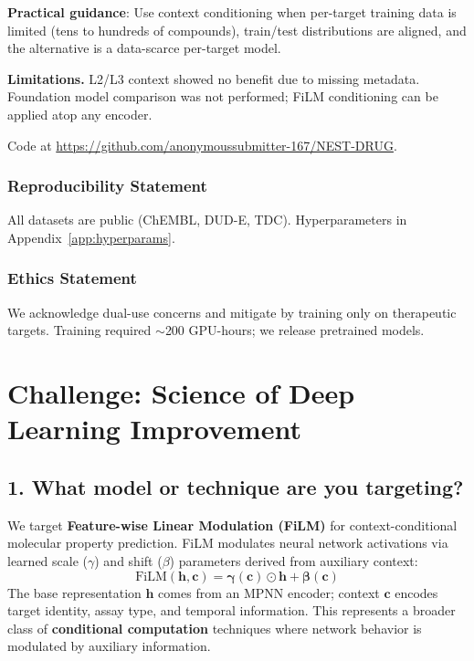 \documentclass{article}
\begin{document}
\textbf{Practical guidance}: Use context conditioning when per-target training data is limited (tens to hundreds of compounds), train/test distributions are aligned, and the alternative is a data-scarce per-target model.

\textbf{Limitations.} L2/L3 context showed no benefit due to missing metadata. Foundation model comparison was not performed; FiLM conditioning can be applied atop any encoder.

Code at \url{https://github.com/anonymoussubmitter-167/NEST-DRUG}.

\subsubsection*{Reproducibility Statement}
All datasets are public (ChEMBL, DUD-E, TDC). Hyperparameters in Appendix~\ref{app:hyperparams}.

\subsubsection*{Ethics Statement}
We acknowledge dual-use concerns and mitigate by training only on therapeutic targets. Training required $\sim$200 GPU-hours; we release pretrained models.





\newpage
\section*{Challenge: Science of Deep Learning Improvement}

\subsection*{1. What model or technique are you targeting?}

We target \textbf{Feature-wise Linear Modulation (FiLM)} \citep{perez_2018_film} for context-conditional molecular property prediction. FiLM modulates neural network activations via learned scale ($\gamma$) and shift ($\beta$) parameters derived from auxiliary context:
\begin{equation}
\text{FiLM}(\mathbf{h}, \mathbf{c}) = \boldsymbol{\gamma}(\mathbf{c}) \odot \mathbf{h} + \boldsymbol{\beta}(\mathbf{c})
\end{equation}
The base representation $\mathbf{h}$ comes from an MPNN encoder; context $\mathbf{c}$ encodes target identity, assay type, and temporal information. This represents a broader class of \textbf{conditional computation} techniques where network behavior is modulated by auxiliary information.
\end{document}
